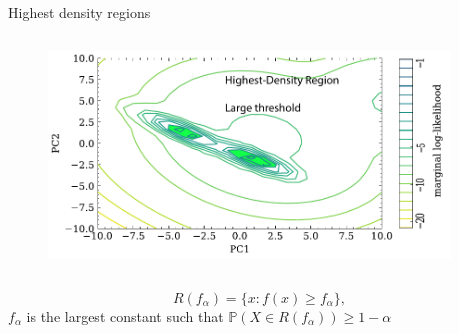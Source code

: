\documentclass[t]{beamer}
\newcommand{\prob}{\mathbb{P}}
\theoremstyle{definition}
\begin{document}
\begin{frame}{Highest density regions}

    \begin{columns}[T] %
    
    \begin{column}{0.382\textwidth} %
    
        \begin{figure}
        \includegraphics[width=\textwidth]{figs/de_pc1_pc2_likelihood_hdr_large_threshold.pdf}
    \end{figure}
    \end{column}
    
    \begin{column}{0.618\textwidth} %
    \end{column}
    
    \end{columns}
    \begin{definition}
        \begin{equation*}
            R(f_\alpha) = \{ x : f(x) \geq f_\alpha \},
        \end{equation*}
        $f_\alpha$ is the largest constant such that $\prob(X \in R(f_\alpha)) \geq 1-\alpha$
    \end{definition}


\end{frame}
\end{document}
